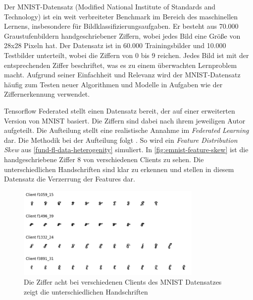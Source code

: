 Der MNIST-Datensatz (Modified National Institute of Standards and Technology) ist ein weit verbreiteter Benchmark im Bereich des maschinellen Lernens, insbesondere für Bildklassifizierungsaufgaben. Er besteht aus 70.000 Graustufenbildern handgeschriebener Ziffern, wobei jedes Bild eine Größe von 28x28 Pixeln hat. Der Datensatz ist in 60.000 Trainingsbilder und 10.000 Testbilder unterteilt, wobei die Ziffern von 0 bis 9 reichen. Jedes Bild ist mit der entsprechenden Ziffer beschriftet, was es zu einem überwachten Lernproblem macht. Aufgrund seiner Einfachheit und Relevanz wird der MNIST-Datensatz häufig zum Testen neuer Algorithmen und Modelle in Aufgaben wie der Ziffernerkennung verwendet.

Tensorflow Federated stellt einen Datensatz bereit, der auf einer erweiterten Version von MNIST basiert. Die Ziffern sind dabei nach ihrem jeweiligen Autor aufgeteilt. Die Aufteilung stellt eine realistische Annahme im \textit{Federated Learning} dar. Die Methodik bei der Aufteilung folgt \textcite{caldas:2018}. So wird ein \textit{Feature Distribution Skew} aus \autoref{fund-fl-data-heterogenity} simuliert. In \autoref{fig:emnist-feature-skew} ist die handgeschriebene Ziffer 8 von verschiedenen Clients zu sehen. Die unterschiedlichen Handschriften sind klar zu erkennen und stellen in diesem Datensatz die Verzerrung der Features dar.

\begin{figure}[tb]
	\centering
	\includegraphics[width=0.8\textwidth]{Bilder/emnist_feature_distribution_skew.png}
	\caption{Die Ziffer acht bei verschiedenen Clients des MNIST Datensatzes zeigt die unterschiedlichen Handschriften}
	\label{fig:emnist-feature-skew}
\end{figure}

